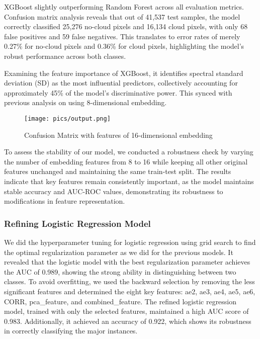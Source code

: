 \documentclass[10pt,letterpaper]{article}
\begin{document}
XGBoost slightly outperforming Random Forest across all evaluation metrics. Confusion matrix analysis reveals that out of 41,537 test samples, the model correctly classified 25,276 no-cloud pixels and 16,134 cloud pixels, with only 68 false positives and 59 false negatives. This translates to error rates of merely 0.27\% for no-cloud pixels and 0.36\% for cloud pixels, highlighting the model's robust performance across both classes.

Examining the feature importance of XGBoost, it identifies  spectral standard deviation (SD) as the most influential predictors, collectively accounting for approximately 45\% of the model's discriminative power. This synced with previous analysis on using 8-dimensional embedding. 

\begin{figure}[htbp]
    \centering
    \texttt{[image: pics/output.png]}
    \caption{Confusion Matrix with features of 16-dimensional embedding}
\end{figure}

To assess the stability of our model, we conducted a robustness check by varying the number of embedding features from 8 to 16 while keeping all other original features unchanged and maintaining the same train-test split. The results indicate that key features remain consistently important, as the model maintains stable accuracy and AUC-ROC values, demonstrating its robustness to modifications in feature representation.

\subsubsection{Refining Logistic Regression Model}

We did the hyperparameter tuning for logistic regression using grid search to find the optimal regularization parameter as we did for the previous models. It revealed that the logistic model with the best regularization parameter achieves the AUC of 0.989, showing the strong ability in distinguishing between two classes. To avoid overfitting, we used the backward selection by removing the less significant features and determined the eight key features: ae2, ae3, ae4, ae5, ae6, CORR, pca\_feature, and combined\_feature. The refined logistic regression model, trained with only the selected features, maintained a high AUC score of 0.983. Additionally, it achieved an accuracy of 0.922, which shows its robustness in correctly classifying the major instances.
\end{document}
